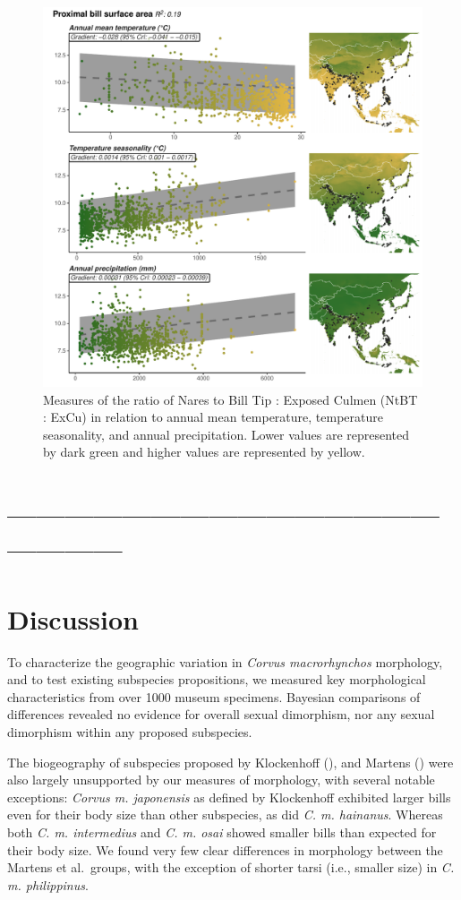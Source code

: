 \documentclass[10pt,a4paper]{article}
\begin{document}
\begin{figure}
\includegraphics[width=0.9\linewidth]{../Figures/climMap_ExCuNtBTxHaNaTaLe} \caption{Measures of the ratio of Nares to Bill Tip : Exposed Culmen (NtBT : ExCu) in relation to annual mean temperature, temperature seasonality, and annual precipitation. Lower values are represented by dark green and higher values are represented by yellow.}\label{fig:climateComparisonMapPBSA}
\end{figure}

\section{---------------------------------------------------------}\label{section}

\section{Discussion}\label{discussion}

To characterize the geographic variation in \emph{Corvus macrorhynchos} morphology, and to test existing subspecies propositions, we measured key morphological characteristics from over 1000 museum specimens.
Bayesian comparisons of differences revealed no evidence for overall sexual dimorphism, nor any sexual dimorphism within any proposed subspecies.

The biogeography of subspecies proposed by Klockenhoff (), and Martens () were also largely unsupported by our measures of morphology, with several notable exceptions: \emph{Corvus m. japonensis} as defined by Klockenhoff exhibited larger bills even for their body size than other subspecies, as did \emph{C. m. hainanus}.
Whereas both \emph{C. m. intermedius} and \emph{C. m. osai} showed smaller bills than expected for their body size.
We found very few clear differences in morphology between the Martens et al.~groups, with the exception of shorter tarsi (i.e., smaller size) in \emph{C. m. philippinus}.
\end{document}
